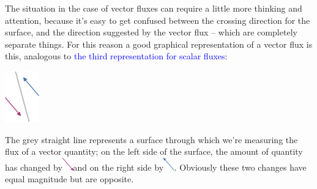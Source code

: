 \documentclass[a4paper,12pt,%
onecolumn,oneside,titlepage,%
british%
]{memoir}
\renewcommand*{\|}[1][]{\nonscript\:#1\vert\nonscript\:\mathopen{}}
\newcommand*{\sect}{\S}%
\renewcommand*{\autoref}[2]{\sidepar{\vspace{-1ex}\footnotesize{\color{blue}\faIcon{%
angle-right%
}\enspace\sect\,\ref{#1} page\,\pageref{#1}}}\textcolor{blue}{#2}}
\begin{document}
The situation in the case of vector fluxes can require a little more thinking and attention, because it's easy to get confused between the crossing direction for the surface, and the direction suggested by the vector flux -- which are completely separate things. For this reason a good graphical representation of a vector flux is this, analogous to \autoref{fig:scalar_fluxes}{the third representation for scalar fluxes}:
\begin{center}
  \includegraphics[height=6em]{images/flux_vec_minusplus.pdf}
\end{center}
The \textcolor{midgrey}{grey straight line} represents a surface through which we're measuring the flux of a vector quantity; on the left side of the surface, the amount of quantity has changed by\enspace\includegraphics[align=c,height=1.5em]{images/vec_flux_left.pdf}\enspace and on the right side by\enspace\includegraphics[align=c,height=1.5em]{images/vec_flux_right.pdf}\:.
Obviously these two changes have equal magnitude but are opposite.

\medskip
\end{document}
